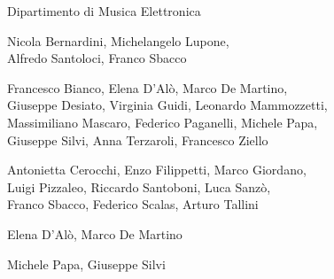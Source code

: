 

%
%
	
{\fontsize{24}{22} }

\medskip

{\fontsize{12}{12} \textsf{Dipartimento di Musica Elettronica}}

\vspace{.5cm}

\textbf{}

Nicola Bernardini, Michelangelo Lupone, \\ Alfredo Santoloci, Franco Sbacco

\medskip

\textbf{}

Francesco Bianco, Elena D’Alò, Marco De Martino, \\ Giuseppe Desiato, Virginia Guidi, Leonardo Mammozzetti, \\ Massimiliano Mascaro, Federico Paganelli, Michele Papa, \\Giuseppe Silvi, Anna Terzaroli, Francesco Ziello  

\medskip

\textbf{}

Antonietta Cerocchi, Enzo Filippetti, Marco Giordano, \\Luigi Pizzaleo, Riccardo Santoboni, Luca Sanzò, \\ Franco Sbacco, Federico Scalas, Arturo Tallini

\medskip

\textbf{}

Elena D’Alò, Marco De Martino

\medskip

\textbf{}

Michele Papa, Giuseppe Silvi

\medskip

